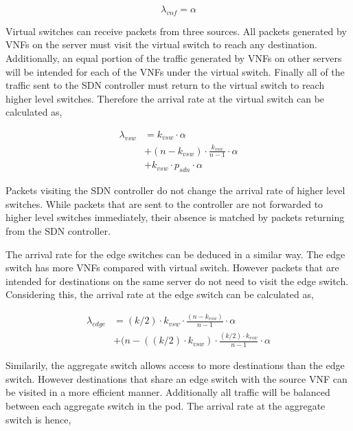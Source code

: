 \begin{equation}
\label{eq:arr_vnf}
\lambda_{vnf} = \alpha
\end{equation}

Virtual switches can receive packets from three sources. All packets generated by VNFs on the server must visit the virtual switch to reach any destination. Additionally, an equal portion of the traffic generated by VNFs on other servers will be intended for each of the VNFs under the virtual switch. Finally all of the traffic sent to the SDN controller must return to the virtual switch to reach higher level switches. Therefore the arrival rate at the virtual switch can be calculated as,

\begin{equation}
\label{eq:arr_srv}
\begin{split}
\lambda_{vsw} &= k_{vsw} \cdot \alpha \\
			  &+ (n - k_{vsw}) \cdot \frac{k_{vsw}}{n - 1} \cdot \alpha \\
			  &+ k_{vsw} \cdot p_{sdn} \cdot \alpha
\end{split}
\end{equation}

Packets visiting the SDN controller do not change the arrival rate of higher level switches. While packets that are sent to the controller are not forwarded to higher level switches immediately, their absence is matched by packets returning from the SDN controller.

The arrival rate for the edge switches can be deduced in a similar way. The edge switch has more VNFs compared with virtual switch. However packets that are intended for destinations on the same server do not need to visit the edge switch. Considering this, the arrival rate at the edge switch can be calculated as,

\begin{equation}
\label{eq:arr_edge}
\begin{split}
\lambda_{edge} &= (k/2) \cdot k_{vsw} \cdot \frac{(n - k_{vsw})}{n - 1} \cdot \alpha \\
			   &+ (n - ((k/2) \cdot k_{vsw}) \cdot \frac{(k/2) \cdot k_{vsw}}{n - 1} \cdot \alpha 
\end{split}
\end{equation}

Similarily, the aggregate switch allows access to more destinations than the edge switch. However destinations that share an edge switch with the source VNF can be visited in a more efficient manner. Additionally all traffic will be balanced between each aggregate switch in the pod. The arrival rate at the aggregate switch is hence,

